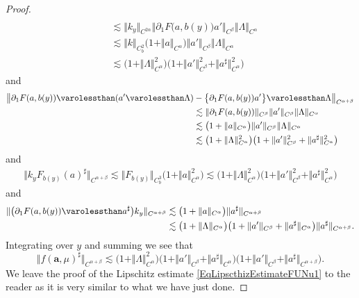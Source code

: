 \documentclass[10pt]{amsart}
\theoremstyle{definition}
\newcommand{\bsa}{\boldsymbol{a}}
\newcommand{\norme}[1]{\Vert #1 \Vert}
\begin{document}
\begin{proof}
\begin{equation*}
\begin{split}
\\
&\lesssim \norme{k_y}_{C^{2\alpha}}\norme{\partial_1 F\bigl(a, b(y)\bigr) a'}_{C^\beta} \norme{\Lambda}_{C^\alpha}
\\
&\lesssim \norme{k}_{C^2_b}\bigl(1+\norme{a}_{C^\alpha}\bigr)\norme{a'}_{C^\beta}\norme{\Lambda}_{C^\alpha}
\\
&\lesssim \bigl(1+\norme{\Lambda}^2_{C^\alpha}\bigr) \bigl(1+\norme{a'}^2_{C^\beta} + \Vert a^\sharp\Vert^2_{C^\alpha} \bigr)
\end{split} \end{equation*}
and
\begin{equation*} \begin{split}
\big\Vert \partial_1F(a, b(y)) \varolessthan (a' \varolessthan \Lambda) &- \bigl\{ \partial_1F(a, b(y)) a'\bigr\} \varolessthan \Lambda \big\Vert_{C^{\alpha+\beta}} \\
&\lesssim \norme{\partial_1 F(a, b(y))}_{C^\beta} \norme{a'}_{C^\beta}\norme{\Lambda}_{C^\alpha} \\
&\lesssim \bigl(1+\norme{a}_{C^\alpha}\bigr) \norme{a'}_{C^\beta}\norme{\Lambda}_{C^\alpha} \\
&\lesssim \bigl(1+\norme{\Lambda}^2_{C^\alpha}\bigr) \bigl(1+\norme{a'}^2_{C^\beta} + \Vert a^\sharp\Vert^2_{C^\alpha} \bigr)
\end{split} \end{equation*}
and
\begin{equation*} \begin{split}
\norme{k_y F_{b(y)}(a)^\sharp}_{C^{\alpha+\beta}} \lesssim \norme{F_{b(y)}}_{C^3_b}\bigl(1+\norme{a}_{C^\alpha}^2\bigr) \lesssim \bigl(1+\norme{\Lambda}^2_{C^\alpha}\bigr)\bigl(1+\norme{a'}^2_{C^\beta} + \Vert a^\sharp\Vert_{C^\alpha}^2\bigr)
\end{split} \end{equation*}
and
\begin{equation*} \begin{split}
\norme{ \bigl(\partial_1 F(a, b(y)) \varolessthan a^\sharp \bigr) k_y}_{C^{\alpha+\beta}} &\lesssim \bigl(1+\norme{a}_{C^\alpha}\bigr) \Vert a^\sharp\Vert_{C^{\alpha+\beta}} \\
&\lesssim \bigl(1+\norme{\Lambda}_{C^\alpha}\bigr)\bigl(1+\norme{a'}_{C^\beta} + \Vert a^\sharp\Vert_{C^\alpha}\bigr) \Vert a^\sharp\Vert_{C^{\alpha+\beta}}.
\end{split} \end{equation*}
Integrating over $y$ and summing we see that
\[
\norme{f(\bsa,\mu)^\sharp}_{C^{\alpha+\beta}} \lesssim \bigl(1+\norme{\Lambda}_{C^\alpha}^2 \bigr)\bigl(1+\norme{a'}_{C^\beta} + \Vert a^\sharp\Vert_{C^\alpha} \bigr)\bigl(1+ \norme{a'}_{C^\beta} + \Vert a^\sharp\Vert_{C^{\alpha+\beta}} \bigr).
\]
We leave the proof of the Lipschitz estimate \eqref{EqLipscthizEstimateFUNu1} to the reader as it is very similar to what we have just done.
\end{proof}
\end{document}
